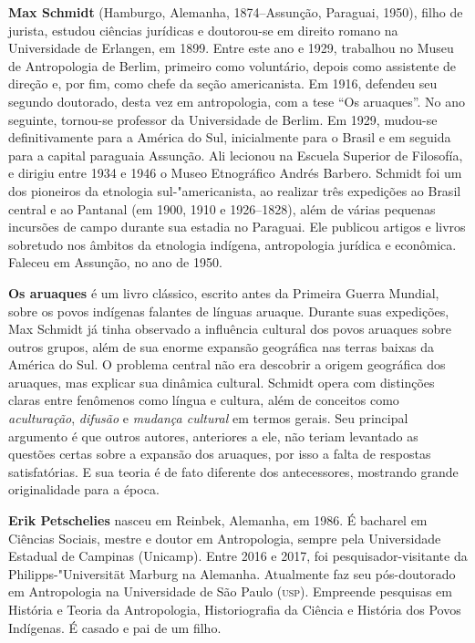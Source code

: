 \textbf{Max Schmidt} (Hamburgo, Alemanha, 1874--Assunção, Paraguai, 1950), filho de jurista, estudou ciências jurídicas e doutorou-se em direito romano na Universidade de Erlangen, em 1899. Entre este ano e 1929, trabalhou no Museu de Antropologia de Berlim, primeiro como voluntário, depois como assistente de direção e, por fim, como chefe da seção americanista. Em 1916, defendeu seu segundo doutorado, desta vez em antropologia, com a tese ``Os aruaques''. No ano seguinte, tornou-se professor da Universidade de Berlim. Em 1929, mudou-se definitivamente para a América do Sul, inicialmente para o Brasil e em seguida para a capital paraguaia Assunção. Ali lecionou na Escuela Superior de Filosofía, e dirigiu entre 1934 e 1946 o Museo Etnográfico Andrés Barbero. Schmidt foi um dos pioneiros da etnologia sul-"americanista, ao realizar três expedições ao Brasil central e ao Pantanal (em 1900, 1910 e 1926--1828), além de várias pequenas incursões de campo durante sua estadia no Paraguai. Ele publicou artigos e livros sobretudo nos âmbitos da etnologia indígena, antropologia jurídica e econômica. Faleceu em Assunção, no ano de 1950.

\textbf{Os aruaques} é um livro clássico, escrito antes da Primeira Guerra Mundial, sobre os povos indígenas falantes de línguas aruaque. Durante suas expedições, Max Schmidt já tinha observado a influência cultural dos povos aruaques sobre outros grupos, além de sua enorme expansão geográfica nas terras baixas da América do Sul. O problema central não era descobrir a origem geográfica dos aruaques, mas explicar sua dinâmica cultural. Schmidt opera com distinções claras entre fenômenos como língua e cultura, além de conceitos como \textit{aculturação}, \textit{difusão} e \textit{mudança cultural} em termos gerais. Seu principal argumento é que outros autores, anteriores a ele, não teriam levantado as questões certas sobre a expansão dos aruaques, por isso a falta de respostas satisfatórias. E sua teoria é de fato diferente dos antecessores, mostrando grande originalidade para a época.

\pagebreak

\textbf{Erik Petschelies} nasceu em Reinbek, Alemanha, em 1986. É bacharel em Ciências Sociais, mestre e doutor em Antropologia, sempre pela Universidade Estadual de Campinas (Unicamp). Entre 2016 e 2017, foi pesquisador-visitante da Philipps-"Universität Marburg na Alemanha. Atualmente faz seu pós-doutorado em Antropologia na Universidade de São Paulo (\textsc{usp}). Empreende pesquisas em História e Teoria da Antropologia, Historiografia da Ciência e História dos Povos Indígenas. É casado e pai de um filho.

